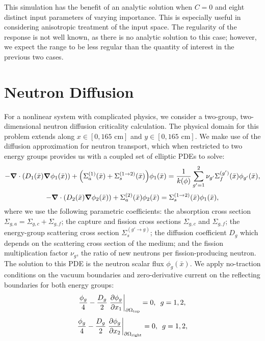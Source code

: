 This simulation has the benefit of an analytic solution when $C=0$ and eight distinct input parameters of
varying importance.  This is especially useful in considering anisotropic treatment of the input space.  The
regularity of the response is not well known, as there is no analytic solution to this case; however, we
expect the range to be less regular than the quantity of interest in the previous two cases.





\section{Neutron Diffusion}
For a nonlinear system with complicated physics, we consider a two-group, two-dimensional neutron diffusion
criticality calculation.  The physical domain for this problem extends along $x\in[0,165\text{ cm}]$ and
$y\in[0,165\text{ cm}]$.
We make use of the diffusion approximation for neutron transport, which when restricted to two energy groups provides us
with a coupled set of elliptic PDEs to solve:
\begin{equation}
-\grad\cdot\qty( D_1(\bar x)\grad\phi_1(\bar x))+\qty(\Sigma_{a}^{(1)}(\bar x)+\Sigma_{s}^{(1\to2)}(\bar x))\phi_1(\bar x) = \frac{1}{k(\phi)}\sum_{g'=1}^2\nu_{g'}\Sigma_{f}^{(g')}(\bar x)\phi_{g'}(\bar x),
\end{equation}
\begin{equation}
-\grad \cdot\qty(D_2(\bar x)\grad \phi_2(\bar x))+\Sigma_{a}^{(2)}(\bar x)\phi_2(\bar x) = \Sigma_{s}^{(1\to 2)}(\bar x)\phi_1(\bar x),
\end{equation}
where we use the following parametric coefficients: 
the absorption cross section $\Sigma_{g,a}=\Sigma_{g,c}+\Sigma_{g,f}$; 
the capture and fission cross sections $\Sigma_{g,c}$ and $\Sigma_{g,f}$; 
the energy-group scattering cross section $\Sigma_s^{(g'\to g)}$; 
the diffusion coefficient $D_g$ which depends on the scattering cross section of the medium;
and the fission multiplication factor $\nu_g$, the ratio of new neutrons per fission-producing neutron.  The
solution to this PDE is the neutron scalar flux $\phi_g(\bar x)$.  We apply no-traction conditions on the
vacuum boundaries and zero-derivative current on the reflecting boundaries for both energy groups:
\begin{equation}
\frac{\phi_g}{4}-\frac{D_g}{2}\eval{\pdv{\phi_g}{x_1}}_{\partial \Omega_\text{top}}=0,\hspace{5pt} g=1,2,
\end{equation}
\begin{equation}
\frac{\phi_g}{4}-\frac{D_g}{2}\eval{\pdv{\phi_g}{x_2}}_{\partial \Omega_\text{right}}=0,\hspace{5pt} g=1,2,
\end{equation}
